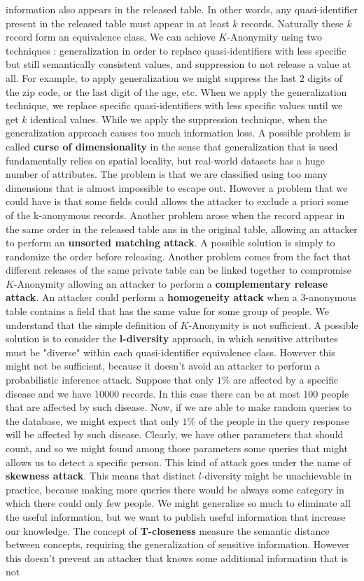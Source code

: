 information also appears in the released table. In other words, any quasi-identifier present in the released table must appear in at least $k$ records. Naturally these $k$ record form an equivalence class. We can achieve $K$-Anonymity using two techniques : generalization in order to replace quasi-identifiers with less specific but still semantically consistent values, and suppression to not release a value at all. For example, to apply generalization we might suppress the last $2$ digits of the zip code, or the last digit of the age, etc. When we apply the generalization technique, we replace specific quasi-identifiers with less specific values until we get $k$ identical values. While we apply the suppression technique, when the generalization approach causes too much information loss. A possible problem is called \textbf{curse of dimensionality} in the sense that generalization that is used fundamentally relies on spatial locality, but real-world datasets has a huge number of attributes. The problem is that we are classified using too many dimensions that is almost impossible to escape out. However a problem that we could have is that some fields could allows the attacker to exclude a priori some of the k-anonymous records. Another problem arose when the record appear in the same order in the released table ans in the original table, allowing an attacker to perform an \textbf{unsorted matching attack}. A possible solution is simply to randomize the order before releasing. Another problem comes from the fact that different releases of the same private table can be linked together to compromise $K$-Anonymity allowing an attacker to perform a \textbf{complementary release attack}. An attacker could perform a \textbf{homogeneity attack} when a $3$-anonymous table contains a field that has the same value for some group of people. We understand that the simple definition of $K$-Anonymity is not sufficient. A possible solution is to consider the \textbf{l-diversity} approach, in which sensitive attributes must be "diverse" within each quasi-identifier equivalence class. However this might not be sufficient, because it doesn't avoid an attacker to perform a probabilistic inference attack. Suppose that only $1 \%$ are affected by a specific disease and we have $10000$ records. In this case there can be at most $100$ people that are affected by such disease. Now, if we are able to make random queries to the database, we might expect that only $1 \%$ of the people in the query response will be affected by such disease. Clearly, we have other parameters that should count, and so we might found among those parameters some queries that might allows us to detect a specific person. This kind of attack goes under the name of \textbf{skewness attack}. This means that distinct $l$-diversity might be unachievable in practice, because making more queries there would be always some category in which there could only few people. We might generalize so much to eliminate all the useful information, but we want to publish useful information that increase our knowledge. The concept of \textbf{T-closeness} measure the semantic distance between concepts, requiring the generalization of sensitive information. However this doesn't prevent an attacker that knows some additional information that is not 